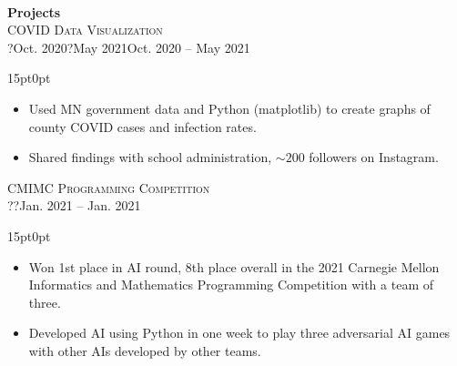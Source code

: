\documentclass[letterpaper,11pt]{article}
\let\oldl\Large
\renewcommand{\Large}[1]{{\color{yale}\oldl{#1}}}
\let\oldsc\textsc{}
\renewcommand{\textsc}[1]{\normalsize\oldsc{#1}}
\newcommand{\years}[2]{\footnotesize \ifx?#1?#2\else#1 -- #2\fi}
\newenvironment{module}[4]{
\textsc{#1} \hfill \textsc{\footnotesize#4}\\
\years{#2}{#3}
\footnotesize \begin{adjustwidth}{15pt}{0pt}
}{
\end{adjustwidth} 
\normalsize \null\vspace{-11pt}
}
\newcommand{\category}[1]{\textbf{\Large{#1}}\vspace{-5pt}\\ \setstretch{1.35}\null\vspace{-5pt}\newline}
\begin{document}
\vspace{-9pt}
\hrulefill\vspace{5pt}\\
\category{Projects}
\begin{module}{COVID Data Visualization}{Oct. 2020}{May 2021}{}
\end{module}\vspace{-25pt}
\begin{itemize}
    \item Used MN government data and Python (matplotlib) to create graphs of county COVID cases and infection rates.
    \item Shared findings with school administration, $\sim200$ followers on Instagram.
\end{itemize}
\begin{module}{CMIMC Programming Competition}{}{Jan. 2021}{}
\end{module}\vspace{-25pt}
\begin{itemize}
    \item Won 1st place in AI round, 8th place overall in the 2021 Carnegie Mellon Informatics and Mathematics Programming Competition with a team of three.
    \item Developed AI using Python in one week to play three adversarial AI games with other AIs developed by other teams.
\end{itemize}
\end{document}
